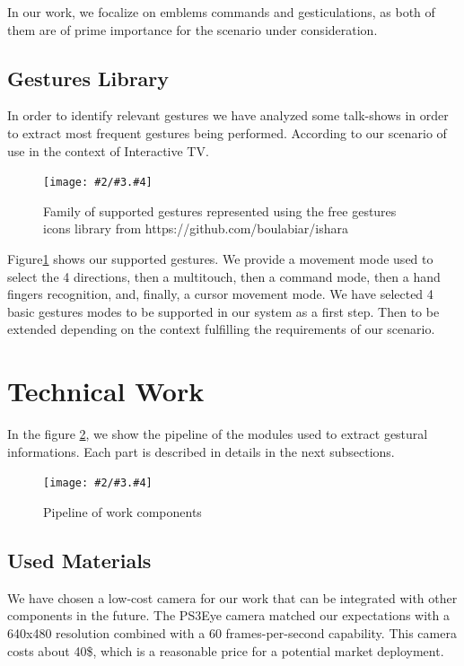 \documentclass{llncs}
\newcommand{\imagepathext}[5]{%
\begin{figure}[!htbp]
\hfil\texttt{[image: \#2/\#3.\#4]}\hfil
\caption{#5\label{#3}}
\end{figure}}
\newcommand{\png}[2]{\imagepathext{width=\columnwidth}{pics}{#1}{png}{#2}}
\begin{document}
In our work, we focalize on emblems commands and gesticulations, as both of them
are of prime importance for the scenario under consideration.

\subsection{Gestures Library}

In order to identify relevant gestures we have analyzed some talk-shows in order
to extract most frequent gestures being performed.
According to our scenario of use in the context of Interactive TV.

\png{handg}{Family of supported gestures represented using the free gestures icons library from https://github.com/boulabiar/ishara }

Figure\ref{handg} shows our supported gestures. We provide a movement mode
used to select the 4 directions, then a multitouch, then a command mode, then a hand fingers recognition,
and, finally, a cursor movement mode.
We have selected 4 basic gestures modes to be supported in our system as a first step.
Then to be extended depending on the context fulfilling the requirements
of our scenario.

\section{Technical Work}

In the figure \ref{pipeline}, we show the pipeline of the modules used to
extract gestural informations. Each part is described in details in the next
subsections.

\png{pipeline}{Pipeline of work components}

\subsection{Used Materials}
We have chosen a low-cost camera for our work that can be integrated with other components in the future.
The PS3Eye camera matched our expectations with a 640x480 resolution combined with a 60 frames-per-second capability.
This camera costs about 40\$, which is a reasonable price for a potential market deployment.
\end{document}
